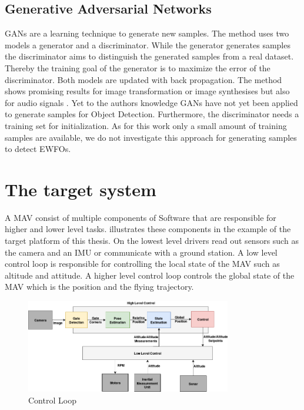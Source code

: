 \subsection{Generative Adversarial Networks}

\acp{GAN} \cite{Goodfellow2014} are a learning technique to generate new samples. The method uses two models a generator and a discriminator. While the generator generates samples the discriminator aims to distinguish the generated samples from a real dataset. Thereby the training goal of the generator is to maximize the error of the discriminator. Both models are updated with back propagation. The method shows promising results for image transformation or image synthesises but also for audio signals \cite{Creswell2017}. Yet to the authors knowledge \acp{GAN} have not yet been applied to generate samples for Object Detection. Furthermore, the discriminator needs a training set for initialization. As for this work only a small amount of training samples are available, we do not investigate this approach for generating samples to detect \acp{EWFO}.

\section{The target system}

A \ac{MAV} consist of multiple components of Software that are responsible for higher and lower level tasks.  illustrates these components in the example of the target platform of this thesis. On the lowest level drivers read out sensors such as the camera and an \ac{IMU} or communicate with a ground station. A low level control loop is responsible for controlling the local state of the \ac{MAV} such as altitude and attitude. A higher level control loop controls the global state of the \ac{MAV} which is the position and the flying trajectory.


\begin{figure}[hbtp]
	\centering
	\includegraphics[width=0.8\textwidth]{fig/control_loop}
	\caption{Control Loop}
	\label{fig:control_loop}
\end{figure}

